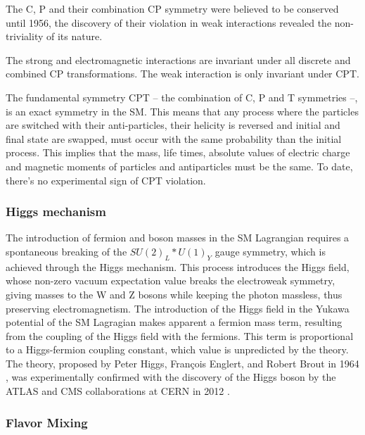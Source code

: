 The C, P and their combination CP symmetry were believed to be conserved until 1956, the discovery of their violation \cite{lee_question_1956, wu_experimental_1957, christenson_evidence_1964} in weak interactions revealed the non-triviality of its nature.

The strong and electromagnetic interactions are invariant under all discrete and combined CP transformations. The weak interaction is only invariant under CPT.

The fundamental symmetry CPT -- the combination of C, P and T symmetries --, is an exact symmetry in the SM. This means that any process where the particles are switched with their anti-particles, their helicity is reversed and initial and final state are swapped, must occur with the same probability than the initial process. This implies that the mass, life times, absolute values of electric charge and magnetic moments of particles and antiparticles must be the same. To date, there's no experimental sign of CPT violation.

\subsubsection{Higgs mechanism}

The introduction of fermion and boson masses in the SM Lagrangian requires a spontaneous breaking of the $SU(2)_L * U(1)_Y$ gauge symmetry, which is achieved through the Higgs mechanism. This process introduces the Higgs field, whose non-zero vacuum expectation value breaks the electroweak symmetry, giving masses to the W and Z bosons while keeping the photon massless, thus preserving electromagnetism. The introduction of the Higgs field in the Yukawa potential of the SM Lagragian makes apparent a fermion mass term, resulting from the coupling of the Higgs field with the fermions. This term is proportional to a Higgs-fermion coupling constant, which value is unpredicted by the theory.
The theory, proposed by Peter Higgs, François Englert, and Robert Brout in 1964 \cite{englert_broken_1964, higgs_broken_1964, higgs_broken_1964-1, guralnik_global_1964}, was experimentally confirmed with the discovery of the Higgs boson by the ATLAS and CMS collaborations at CERN in 2012 \cite{aad_observation_2012, chatrchyan_observation_2012}.

\subsubsection{Flavor Mixing}

